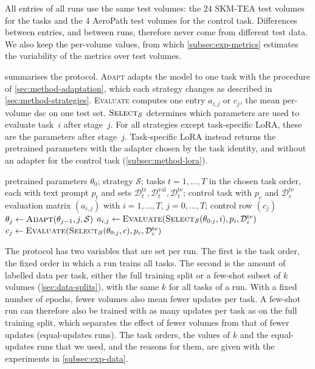 All entries of all runs use the same test volumes: the 24 SKM-TEA test volumes for the tasks and the 4 AeroPath test volumes for the control task.
Differences between entries, and between runs, therefore never come from different test data.
We also keep the per-volume values, from which \cref{subsec:exp-metrics} estimates the variability of the metrics over test volumes.

 summarises the protocol.
\textsc{Adapt} adapts the model to one task with the procedure of \cref{sec:method-adaptation}, which each strategy changes as described in \cref{sec:method-strategies}.
\textsc{Evaluate} computes one entry $a_{i,j}$ or $c_j$, the mean per-volume \gls{dsc} on one test set.
$\textsc{Select}_{\mathcal{S}}$ determines which parameters are used to evaluate task~$i$ after stage~$j$.
For all strategies except task-specific LoRA, these are the parameters after stage~$j$.
Task-specific LoRA instead returns the pretrained parameters with the adapter chosen by the task identity, and without an adapter for the control task (\cref{subsec:method-lora}).

\begin{algorithm}[tb]
\caption{Continual adaptation and evaluation protocol for strategy~$\mathcal{S}$.}
\label{alg:protocol}
\begin{algorithmic}[1]
\REQUIRE pretrained parameters $\theta_0$; strategy $\mathcal{S}$; tasks $t = 1, \dots, T$ in the chosen task order, each with text prompt $p_t$ and sets $\mathcal{D}_t^{\mathrm{tr}}, \mathcal{D}_t^{\mathrm{val}}, \mathcal{D}_t^{\mathrm{te}}$; control task with $p_c$ and $\mathcal{D}_c^{\mathrm{te}}$
\ENSURE evaluation matrix $(a_{i,j})$ with $i = 1, \dots, T$, $j = 0, \dots, T$; control row $(c_j)$
    \STATE $\theta_j \gets \textsc{Adapt}(\theta_{j-1}, j, \mathcal{S})$ 
  \ENDIF
    \STATE $a_{i,j} \gets \textsc{Evaluate}(\textsc{Select}_{\mathcal{S}}(\theta_{0:j}, i), p_i, \mathcal{D}_i^{\mathrm{te}})$
  \ENDFOR
  \STATE $c_j \gets \textsc{Evaluate}(\textsc{Select}_{\mathcal{S}}(\theta_{0:j}, c), p_c, \mathcal{D}_c^{\mathrm{te}})$
\ENDFOR
\end{algorithmic}
\end{algorithm}

The protocol has two variables that are set per run.
The first is the task order, the fixed order in which a run trains all tasks.
The second is the amount of labelled data per task, either the full training split or a few-shot subset of $k$ volumes (\cref{sec:data-splits}), with the same $k$ for all tasks of a run.
With a fixed number of epochs, fewer volumes also mean fewer updates per task.
A few-shot run can therefore also be trained with as many updates per task as on the full training split, which separates the effect of fewer volumes from that of fewer updates (equal-updates runs).
The task orders, the values of $k$ and the equal-updates runs that we used, and the reasons for them, are given with the experiments in \cref{subsec:exp-data}.

